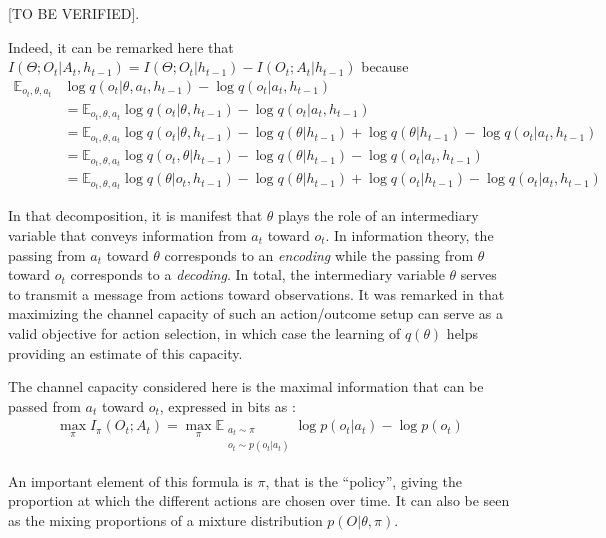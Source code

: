 \documentclass[10pt,letterpaper]{article}
\begin{document}
{\color{gray}
[TO BE VERIFIED]. 

Indeed, it can be remarked here that $I(\Theta;O_t|A_t,h_{t-1})=I(\Theta;O_t|h_{t-1})  - I(O_t;A_t|h_{t-1})$ because 
\begin{align*}
\mathbb{E}_{o_t,\theta, a_t} &\log q(o_t|\theta, a_t, h_{t-1}) - \log q(o_t|a_t, h_{t-1}) \\
                             &= \mathbb{E}_{o_t,\theta, a_t} \log q(o_t|\theta, h_{t-1}) - \log q(o_t|a_t, h_{t-1})\\
                             &= \mathbb{E}_{o_t,\theta, a_t} \log q(o_t|\theta, h_{t-1}) - \log q(\theta|h_{t-1}) + \log q(\theta|h_{t-1}) - \log q(o_t|a_t, h_{t-1})\\
                             &= \mathbb{E}_{o_t,\theta, a_t} \log q(o_t, \theta| h_{t-1}) - \log q(\theta|h_{t-1}) - \log q(o_t|a_t, h_{t-1})\\
                             &= \mathbb{E}_{o_t,\theta, a_t} \log q(\theta|o_t, h_{t-1})  - \log q(\theta|h_{t-1}) + \log q(o_t|h_{t-1}) - \log q(o_t|a_t, h_{t-1})
\end{align*}
}
In that decomposition, it is manifest that $\theta$ plays the role of an intermediary variable that conveys information from $a_t$ toward $o_t$. In information theory, the passing from $a_t$ toward $\theta$ corresponds to an \emph{encoding} while the passing from $\theta$ toward $o_t$ corresponds to a \emph{decoding}. In total, the intermediary variable $\theta$ serves to transmit a message from actions toward observations. It was remarked in \cite{Klyubin2005EmpowermentAU} that maximizing the channel capacity of such an action/outcome setup can serve as a valid objective for action selection, in which case the learning of $q(\theta)$ helps providing an estimate of this capacity. 

The channel capacity considered here is the maximal information that can be passed from $a_t$ toward $o_t$, expressed in bits as :
\begin{align}
\max_{\pi} I_\pi(O_t;A_t) 
= \max_{\pi}\mathbb{E}_{\substack{a_t\sim \pi\\ o_t\sim p(o_t|a_t)}} \log p(o_t|a_t) - \log p(o_t)
\end{align}

An important element of this formula is $\pi$, that is the ``policy'', giving the proportion at which the different actions are chosen over time. It can also be seen as the mixing proportions of a mixture distribution $p(O|\theta,\pi)$. %
\end{document}
